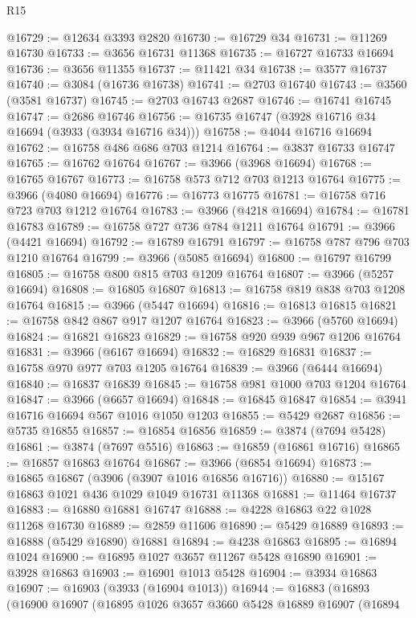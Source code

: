 \begin{lexlean}{R15}
\begin{coremodule}
@16729 := @12634 @3393 @2820
@16730 := @16729 @34
@16731 := @11269 @16730
@16733 := @3656 @16731 @11368
@16735 := @16727 @16733 @16694
@16736 := @3656 @11355
@16737 := @11421 @34
@16738 := @3577 @16737
@16740 := @3084 (@16736 @16738)
@16741 := @2703 @16740
@16743 := @3560 (@3581 @16737)
@16745 := @2703 @16743 @2687
@16746 := @16741 @16745
@16747 := @2686 @16746
@16756 := @16735 @16747 (@3928 @16716 @34 @16694 (@3933 (@3934 @16716 @34)))
@16758 := @4044 @16716 @16694
@16762 := @16758 @486 @686 @703 @1214
@16764 := @3837 @16733 @16747
@16765 := @16762 @16764
@16767 := @3966 (@3968 @16694)
@16768 := @16765 @16767
@16773 := @16758 @573 @712 @703 @1213 @16764
@16775 := @3966 (@4080 @16694)
@16776 := @16773 @16775
@16781 := @16758 @716 @723 @703 @1212 @16764
@16783 := @3966 (@4218 @16694)
@16784 := @16781 @16783
@16789 := @16758 @727 @736 @784 @1211 @16764
@16791 := @3966 (@4421 @16694)
@16792 := @16789 @16791
@16797 := @16758 @787 @796 @703 @1210 @16764
@16799 := @3966 (@5085 @16694)
@16800 := @16797 @16799
@16805 := @16758 @800 @815 @703 @1209 @16764
@16807 := @3966 (@5257 @16694)
@16808 := @16805 @16807
@16813 := @16758 @819 @838 @703 @1208 @16764
@16815 := @3966 (@5447 @16694)
@16816 := @16813 @16815
@16821 := @16758 @842 @867 @917 @1207 @16764
@16823 := @3966 (@5760 @16694)
@16824 := @16821 @16823
@16829 := @16758 @920 @939 @967 @1206 @16764
@16831 := @3966 (@6167 @16694)
@16832 := @16829 @16831
@16837 := @16758 @970 @977 @703 @1205 @16764
@16839 := @3966 (@6444 @16694)
@16840 := @16837 @16839
@16845 := @16758 @981 @1000 @703 @1204 @16764
@16847 := @3966 (@6657 @16694)
@16848 := @16845 @16847
@16854 := @3941 @16716 @16694 @567 @1016 @1050 @1203
@16855 := @5429 @2687
@16856 := @5735 @16855
@16857 := @16854 @16856
@16859 := @3874 (@7694 @5428)
@16861 := @3874 (@7697 @5516)
@16863 := @16859 (@16861 @16716)
@16865 := @16857 @16863 @16764
@16867 := @3966 (@6854 @16694)
@16873 := @16865 @16867 (@3906 (@3907 @1016 @16856 @16716))
@16880 := @15167 @16863 @1021 @436 @1029 @1049 @16731 @11368
@16881 := @11464 @16737
@16883 := @16880 @16881 @16747
@16888 := @4228 @16863 @22 @1028 @11268 @16730
@16889 := @2859 @11606
@16890 := @5429 @16889
@16893 := @16888 (@5429 @16890) @16881
@16894 := @4238 @16863
@16895 := @16894 @1024
@16900 := @16895 @1027 @3657 @11267 @5428 @16890
@16901 := @3928 @16863
@16903 := @16901 @1013 @5428
@16904 := @3934 @16863
@16907 := @16903 (@3933 (@16904 @1013))
@16944 := @16883
    (@16893
      (@16900
        @16907
        (@16895
          @1026
          @3657
          @3660
          @5428
          @16889
          @16907
          (@16894

\end{coremodule}
\end{lexlean}
